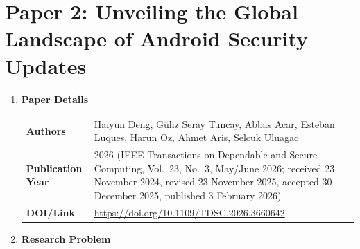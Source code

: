 \documentclass[11pt,a4paper]{article}
\newcommand{\entrypart}[1]{\textbf{\color{accent}#1}\par\vspace{2pt}}
\begin{document}
\newpage

\section{Paper 2: Unveiling the Global Landscape of Android Security Updates}

\begin{enumerate}

    \item \entrypart{Paper Details}

    \begin{tabular}{@{}>{\bfseries}p{3.2cm} p{11.5cm}@{}}
        Authors          & Haiyun Deng, G\"{u}liz Seray Tuncay, Abbas Acar, Esteban Luques, Harun Oz, Ahmet Aris, Selcuk Uluagac \\[2pt]
        Publication Year & 2026 (IEEE Transactions on Dependable and Secure Computing, Vol.\ 23, No.\ 3, May/June 2026; received 23 November 2024, revised 23 November 2025, accepted 30 December 2025, published 3 February 2026) \\[2pt]
        DOI/Link         & \url{https://doi.org/10.1109/TDSC.2026.3660642}
    \end{tabular}

    \item \entrypart{Research Problem}


\end{enumerate}
\end{document}
